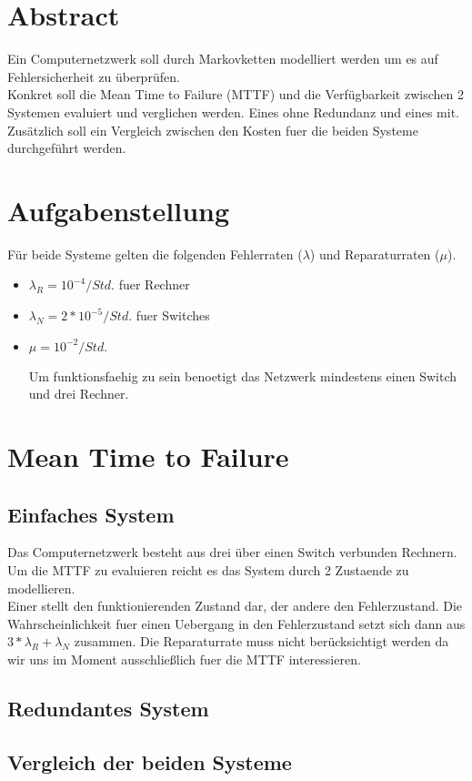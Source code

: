 \documentclass[10pt,a4paper]{article}
\begin{document}


\newpage
\section{Abstract}
Ein Computernetzwerk soll durch Markovketten modelliert werden um es auf Fehlersicherheit zu überprüfen.
\\ 
Konkret soll die Mean Time to Failure (MTTF) und die Verfügbarkeit zwischen 2 Systemen evaluiert und verglichen werden. Eines ohne Redundanz und eines mit.
Zusätzlich soll ein Vergleich zwischen den Kosten fuer die beiden Systeme durchgeführt werden.
\section{Aufgabenstellung}
Für beide Systeme gelten die folgenden Fehlerraten ($\lambda$) und Reparaturraten ($\mu$).
\begin{itemize}
	\item $\lambda_R=10^{-4}/Std.$ fuer Rechner
	\item $\lambda_N=2*10^{-5}/Std.$ fuer Switches
	\item  $\mu=10^{-2}/Std. $
	
Um funktionsfaehig zu sein benoetigt das Netzwerk mindestens einen Switch und drei Rechner.
\end{itemize}
\section{Mean Time to Failure}
\subsection{Einfaches System}
Das Computernetzwerk besteht aus drei über einen Switch verbunden Rechnern.
\\
Um die MTTF zu evaluieren reicht es das System durch 2 Zustaende zu modellieren. \\
Einer stellt den funktionierenden Zustand dar, der andere den Fehlerzustand.
Die Wahrscheinlichkeit fuer einen Uebergang in den Fehlerzustand setzt sich dann aus $3*\lambda_R + \lambda_N$ zusammen.
Die Reparaturrate muss nicht berücksichtigt werden da wir uns im Moment ausschließlich fuer die MTTF interessieren.
\subsection{Redundantes System}
\subsection{Vergleich der beiden Systeme}
\end{document}
